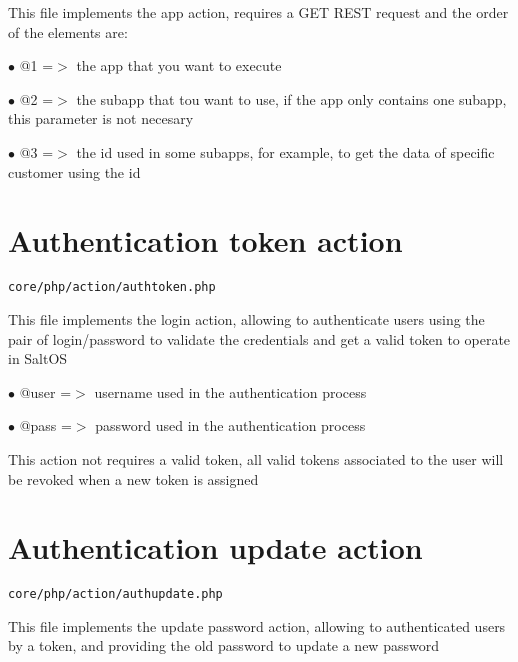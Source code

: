 \documentclass[a4paper]{book}
\begin{document}
This file implements the app action, requires a GET REST request
and the order of the elements are:

\begin{compactitem}
\item[\color{myblue}$\bullet$] @1 =$>$ the app that you want to execute
\item[\color{myblue}$\bullet$] @2 =$>$ the subapp that tou want to use, if the app only contains
      one subapp, this parameter is not necesary
\item[\color{myblue}$\bullet$] @3 =$>$ the id used in some subapps, for example, to get the data
      of specific customer using the id
\end{compactitem}

\hypertarget{toc6}{}
\section{Authentication token action}

\begin{lstlisting}
core/php/action/authtoken.php
\end{lstlisting}

This file implements the login action, allowing to authenticate users
using the pair of login/password to validate the credentials and get
a valid token to operate in SaltOS

\begin{compactitem}
\item[\color{myblue}$\bullet$] @user =$>$ username used in the authentication process
\item[\color{myblue}$\bullet$] @pass =$>$ password used in the authentication process
\end{compactitem}

This action not requires a valid token, all valid tokens associated
to the user will be revoked when a new token is assigned

\hypertarget{toc7}{}
\section{Authentication update action}

\begin{lstlisting}
core/php/action/authupdate.php
\end{lstlisting}

This file implements the update password action, allowing to authenticated
users by a token, and providing the old password to update a new password
\end{document}
